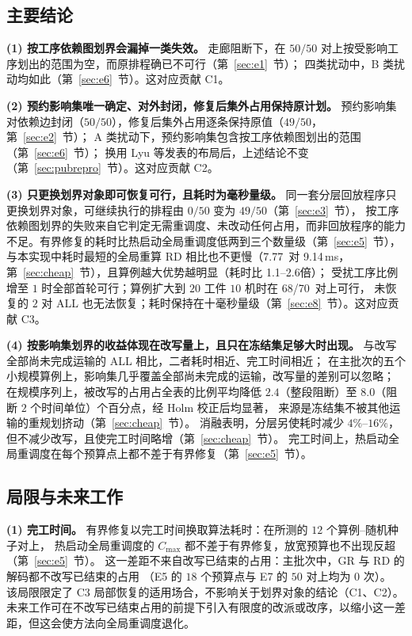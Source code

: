 \documentclass[manuscript,screen,review]{acmart}
\newcommand{\NPairs}{50}
\newcommand{\PassMiss}{\NPairs/\NPairs}      %
\newcommand{\FeasRone}{0/\NPairs}            %
\newcommand{\FeasRtwo}{49/\NPairs}           %
\newcommand{\PassClosed}{\NPairs/\NPairs}    %
\newcommand{\PassInvar}{49/\NPairs}          %
\newcommand{\EfiveCells}{12}        %
\newcommand{\MsRedecode}{9.14}       %
\newcommand{\MsCheapRtwo}{7.77}      %
\newcommand{\ScalePairs}{70}
\newcommand{\ScaleJobsHi}{20}
\newcommand{\ScaleMachHi}{10}
\newcommand{\ScaleRatioLo}{1.1}      %
\newcommand{\ScaleRatioHi}{2.6}      %
\newcommand{\ScaleFeasAll}{68/\ScalePairs}     %
\begin{document}
\subsection{主要结论}

\textbf{(1) 按工序依赖图划界会漏掉一类失效。}
走廊阻断下，在 \(\PassMiss\) 对上按受影响工序划出的范围为空，而原排程确已不可行（第~\ref{sec:e1}~节）；
四类扰动中，B 类扰动均如此（第~\ref{sec:e6}~节）。这对应贡献 C1。

\textbf{(2) 预约影响集唯一确定、对外封闭，修复后集外占用保持原计划。}
预约影响集对依赖边封闭（\(\PassClosed\)），修复后集外占用逐条保持原值（\(\PassInvar\)，第~\ref{sec:e2}~节）；
A 类扰动下，预约影响集包含按工序依赖图划出的范围（第~\ref{sec:e6}~节）；
换用 Lyu 等发表的布局后，上述结论不变（第~\ref{sec:pubrepro}~节）。这对应贡献 C2。

\textbf{(3) 只更换划界对象即可恢复可行，且耗时为毫秒量级。}
同一套分层回放程序只更换划界对象，可继续执行的排程由 \(\FeasRone\) 变为 \(\FeasRtwo\)（第~\ref{sec:e3}~节），
按工序依赖图划界的失败来自它判定无需重调度、未改动任何占用，而非回放程序的能力不足。有界修复的耗时比热启动全局重调度低两到三个数量级（第~\ref{sec:e5}~节），
与本实现中耗时最短的全局重算 RD 相比也不更慢（\MsCheapRtwo\ 对 \MsRedecode\,ms，第~\ref{sec:cheap}~节），且算例越大优势越明显（耗时比 \ScaleRatioLo--\ScaleRatioHi 倍）；
受扰工序比例增至 \(1\) 时全部首轮可行；算例扩大到 \(\ScaleJobsHi\) 工件 \(\ScaleMachHi\) 机时在 \ScaleFeasAll\ 对上可行，
未恢复的 \(2\) 对 ALL 也无法恢复；耗时保持在十毫秒量级（第~\ref{sec:e8}~节）。这对应贡献 C3。

\textbf{(4) 按影响集划界的收益体现在改写量上，且只在冻结集足够大时出现。}
与改写全部尚未完成运输的 ALL 相比，二者耗时相近、完工时间相近；
在主批次的五个小规模算例上，影响集几乎覆盖全部尚未完成的运输，改写量的差别可以忽略；
在规模序列上，被改写的占用占全表的比例平均降低 \(2.4\)（整段阻断）至 \(8.0\)（阻断 \(2\) 个时间单位）个百分点，经 Holm 校正后均显著，
来源是冻结集不被其他运输的重规划挤动（第~\ref{sec:cheap}~节）。
消融表明，分层另使耗时减少 \(4\%\)--\(16\%\)，但不减少改写，且使完工时间略增（第~\ref{sec:cheap}~节）。
完工时间上，热启动全局重调度在每个预算点上都不差于有界修复（第~\ref{sec:e5}~节）。

\subsection{局限与未来工作}
\label{sec:limitations}

\textbf{(1) 完工时间。}
有界修复以完工时间换取算法耗时：在所测的 \(\EfiveCells\) 个算例--随机种子对上，
热启动全局重调度的 \(C_{\max}\) 都不差于有界修复，放宽预算也不出现反超（第~\ref{sec:e5}~节）。
这一差距不来自改写已结束的占用：主批次中，GR 与 RD 的解码都不改写已结束的占用
（E5 的 \(18\) 个预算点与 E7 的 \(\NPairs\) 对上均为 \(0\) 次）。
该局限限定了 C3 局部恢复的适用场合，不影响关于划界对象的结论（C1、C2）。
未来工作可在不改写已结束占用的前提下引入有限度的改派或改序，以缩小这一差距，但这会使方法向全局重调度退化。
\end{document}
